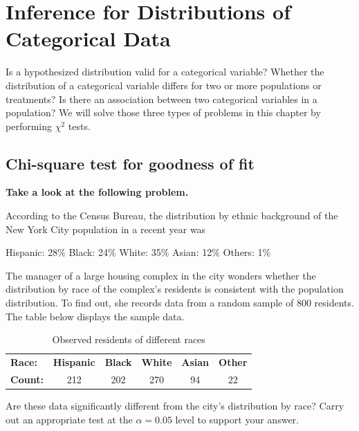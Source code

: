 \documentclass[a4paper, 12pt,twoside]{book}
\begin{document}
\pagestyle{fancy}
\fancyhf{}
\renewcommand{\chaptermark}[1]{ \markboth{#1}{} }
\fancyhead[CE,CO]{\leftmark}
\fancyfoot[LE,RO]{\thepage}
\chapter{Inference for Distributions of Categorical Data}

Is a hypothesized distribution valid for a categorical variable? Whether the distribution of a categorical variable differs for two or more populations or treatments? Is there an association between two categorical variables in a population? We will solve those three types of problems in this chapter by performing $\chi^2$ tests.
\newpage

\section{Chi-square test for goodness of fit}
\textbf{Take a look at the following problem.}\vspace{0.3cm}

 According to the Census Bureau, the 
 distribution by ethnic background of the New York City population in a recent year was \vspace{0.3cm}
 
 Hispanic: 28\% \hspace{0.2cm} Black: 24\%\hspace{0.2cm} White: 35\% \hspace{0.2cm}Asian: 12\% \hspace{0.2cm}Others: 1\%\vspace{0.3cm}
 
The manager of a large housing complex in the city wonders whether the distribution by race of the complex's residents is consistent with the population distribution. To find out, she records data from a random sample of 800 residents. The table below displays the sample data.
    \begin{table}[H]
    \centering
    \begin{tabular}{lcccc c}
    \hline
   \textbf{Race:}& \textbf{Hispanic}& \textbf{Black}& \textbf{White} &\textbf{Asian} &\textbf{Other}\\
   \textbf{Count:}& 212 &202 &270 &94 &22\\
   \hline
    \end{tabular}
    \caption{Observed residents of different races}
    \label{Observed}
    \end{table}     
Are these data significantly different from the city’s distribution by race? Carry out an appropriate test at the $\alpha = 0.05$ level to support your answer. 
\end{document}
